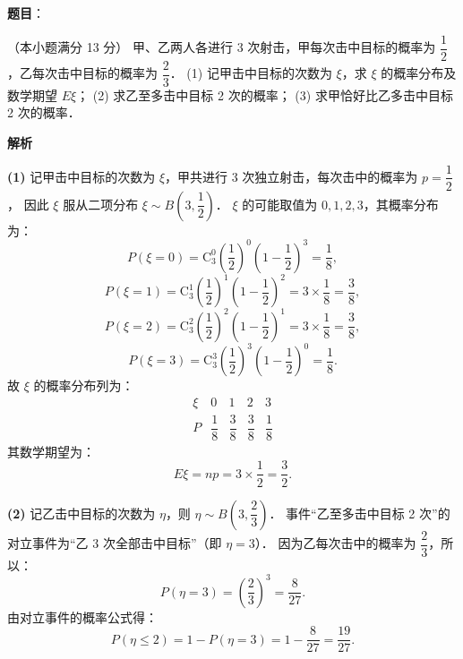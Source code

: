 \begin{answer}

\textbf{题目}：

（本小题满分 13 分）
甲、乙两人各进行 3 次射击，甲每次击中目标的概率为 $\dfrac{1}{2}$，乙每次击中目标的概率为 $\dfrac{2}{3}$．
(1) 记甲击中目标的次数为 $\xi$，求 $\xi$ 的概率分布及数学期望 $E\xi$；
(2) 求乙至多击中目标 2 次的概率；
(3) 求甲恰好比乙多击中目标 2 次的概率．

\textbf{解析}

\textbf{(1)}
记甲击中目标的次数为 $\xi$，甲共进行 3 次独立射击，每次击中的概率为 $p = \dfrac{1}{2}$，
因此 $\xi$ 服从二项分布 $\xi \sim B\left(3, \dfrac{1}{2}\right)$．
$\xi$ 的可能取值为 $0, 1, 2, 3$，其概率分布为：
\nopagebreak[4]
\[
P(\xi = 0) = \mathrm{C}_3^0 \left(\frac{1}{2}\right)^0 \left(1 - \frac{1}{2}\right)^3 = \frac{1}{8},
\]
\nopagebreak[4]
\[
P(\xi = 1) = \mathrm{C}_3^1 \left(\frac{1}{2}\right)^1 \left(1 - \frac{1}{2}\right)^2 = 3 \times \frac{1}{8} = \frac{3}{8},
\]
\nopagebreak[4]
\[
P(\xi = 2) = \mathrm{C}_3^2 \left(\frac{1}{2}\right)^2 \left(1 - \frac{1}{2}\right)^1 = 3 \times \frac{1}{8} = \frac{3}{8},
\]
\nopagebreak[4]
\[
P(\xi = 3) = \mathrm{C}_3^3 \left(\frac{1}{2}\right)^3 \left(1 - \frac{1}{2}\right)^0 = \frac{1}{8}.
\]
故 $\xi$ 的概率分布列为：
\nopagebreak[4]
\[
\begin{array}{c|cccc}
\xi & 0 & 1 & 2 & 3 \\
\hline
P & \dfrac{1}{8} & \dfrac{3}{8} & \dfrac{3}{8} & \dfrac{1}{8}
\end{array}
\]
其数学期望为：
\nopagebreak[4]
\[
E\xi = n p = 3 \times \frac{1}{2} = \frac{3}{2}.
\]

\textbf{(2)}
记乙击中目标的次数为 $\eta$，则 $\eta \sim B\left(3, \dfrac{2}{3}\right)$．
事件“乙至多击中目标 2 次”的对立事件为“乙 3 次全部击中目标”（即 $\eta = 3$）．
因为乙每次击中的概率为 $\dfrac{2}{3}$，所以：
\nopagebreak[4]
\[
P(\eta = 3) = \left(\frac{2}{3}\right)^3 = \frac{8}{27}.
\]
由对立事件的概率公式得：
\nopagebreak[4]
\[
P(\eta \leqslant 2) = 1 - P(\eta = 3) = 1 - \frac{8}{27} = \frac{19}{27}.
\]


\end{answer}
